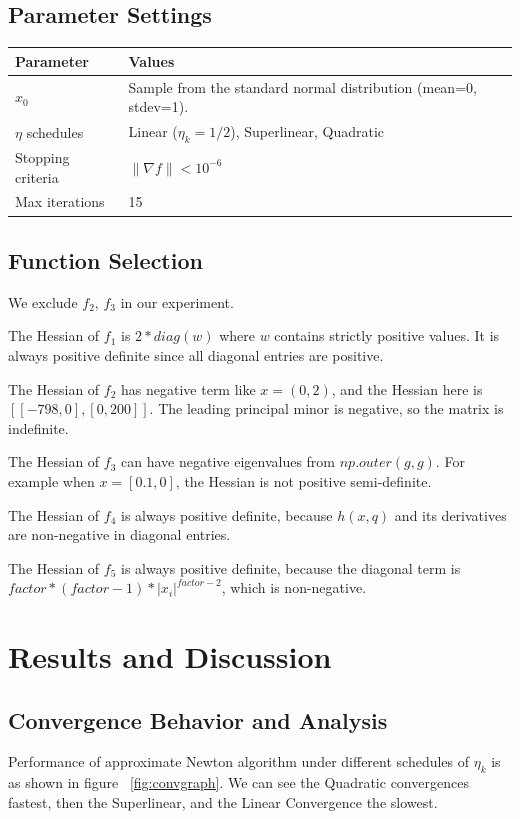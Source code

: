 \documentclass[12pt]{article}
\begin{document}
\subsection{Parameter Settings}
\begin{tabular}{ll}
    \toprule
    Parameter & Values \\ 
    \midrule
    $x_0$ &  Sample from the standard normal distribution (mean=0, stdev=1).\\
    $\eta$ schedules & Linear ($\eta_k = 1/2$), Superlinear, Quadratic \\
    Stopping criteria & $\|\nabla f\| < 10^{-6}$ \\
    Max iterations & 15 \\
    \bottomrule
\end{tabular}

\subsection{Function Selection}
We exclude $f_2$, $f_3$ in our experiment. 

The Hessian of $f_1$ is $2*diag(w)$ where $w$ contains strictly positive values. It is always positive definite since all diagonal entries are positive.

The Hessian of $f_2$ has negative term like $x=(0,2)$, and the Hessian here is $[[-798, 0], [0, 200]]$. The leading principal minor is negative, so the matrix is indefinite. 

The Hessian of $f_3$ can have negative eigenvalues from $np.outer(g,g)$. For example when $x=[0.1,0]$, the Hessian is not positive semi-definite.

The Hessian of $f_4$ is always positive definite, because $h(x,q)$ and its derivatives are non-negative in diagonal entries.

The Hessian of $f_5$ is always positive definite, because the diagonal term is $factor*(factor-1)*|x_i|^{factor-2}$, which is non-negative.


\section{Results and Discussion}

\subsection{Convergence Behavior and Analysis}

Performance of approximate Newton algorithm under different schedules of $\eta_k$ is as shown in figure ~\ref{fig:convgraph}. We can see the Quadratic  convergences fastest, then the Superlinear, and the Linear Convergence the slowest. 
\end{document}
